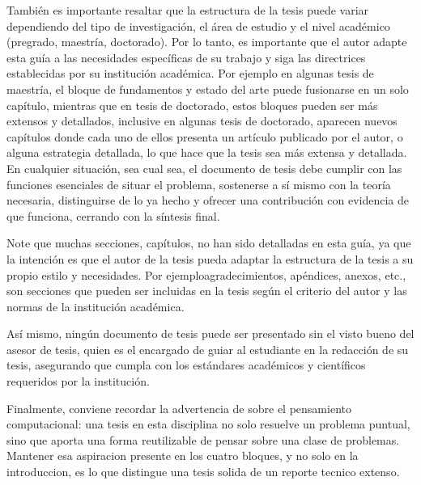 \documentclass[11pt]{article}
\begin{document}
También es importante resaltar que la estructura de la tesis puede variar 
dependiendo del tipo de investigación, el área de estudio y el nivel académico 
(pregrado, maestría, doctorado). Por lo tanto, es importante que el autor adapte 
esta guía a las necesidades específicas de su trabajo y siga las directrices 
establecidas por su institución académica. Por ejemplo en algunas tesis de maestría, 
el bloque de fundamentos y estado del arte puede fusionarse en un solo capítulo,
mientras que en tesis de doctorado, estos bloques pueden ser más extensos y detallados, 
inclusive en algunas tesis de doctorado, aparecen nuevos capítulos donde cada uno de ellos
presenta un artículo publicado por el autor, o alguna estrategia detallada, 
lo que hace que la tesis sea más extensa y detallada. En cualquier situación, sea cual 
sea, el documento de tesis debe cumplir con las funciones esenciales de situar el problema,
sostenerse a sí mismo con la teoría necesaria, distinguirse de lo ya hecho y
ofrecer una contribución con evidencia de que funciona, cerrando con la síntesis final. 

Note que muchas secciones, capítulos, no han sido detalladas en esta guía, 
ya que la intención es que el autor de la tesis pueda adaptar la estructura de la tesis a 
su propio estilo y necesidades. Por ejemploagradecimientos, apéndices, anexos, etc., son
secciones que pueden ser incluidas en la tesis según el criterio del autor y las normas de 
la institución académica. 

Así mismo, ningún documento de tesis puede ser presentado sin el visto bueno del 
asesor de tesis, quien es el encargado de guiar al estudiante en la redacción de su 
tesis, asegurando que cumpla con los estándares académicos y científicos requeridos por la institución.  


Finalmente, conviene recordar la advertencia de \citet{wing2006computational}
sobre el pensamiento computacional: una tesis en esta disciplina no solo
resuelve un problema puntual, sino que aporta una forma reutilizable de
pensar sobre una clase de problemas. Mantener esa aspiracion presente en los
cuatro bloques, y no solo en la introduccion, es lo que distingue una
tesis solida de un reporte tecnico extenso. 

\newpage
\printbibliography
\end{document}

